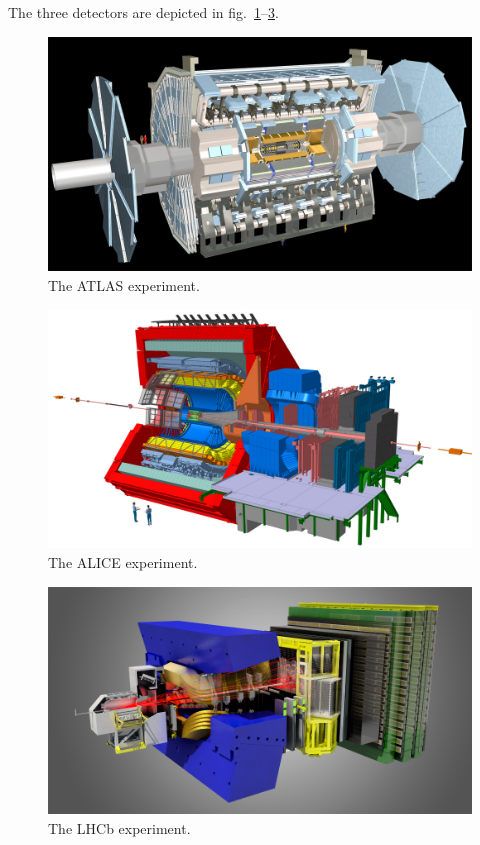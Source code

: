 \vspace*{1\baselineskip}

\noindent The three detectors are depicted in fig.~\ref{fig:ATLAS}--\ref{fig:LHCb}.


\begin{figure}%
\centering
\includegraphics[width=.6\textwidth]{figures/ATLAS.jpg}
\caption{The ATLAS experiment.}
\label{fig:ATLAS}
\end{figure}

\begin{figure}%
\centering
\includegraphics[width=.6\textwidth]{figures/ALICE.jpg}
\caption{The ALICE experiment.}
\label{fig:ALICE}
\end{figure}

\begin{figure}%
\centering
\includegraphics[width=.6\textwidth]{figures/LHCb.png}
\caption{The LHCb experiment.}
\label{fig:LHCb}
\end{figure}

\clearpage
